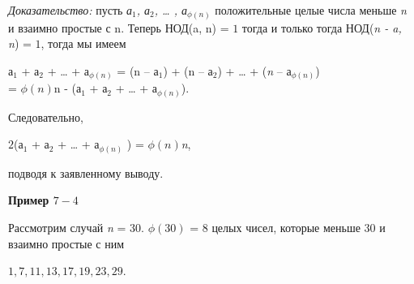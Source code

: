 \documentclass[12pt]{article}
\begin{document}
	
	\textit{Доказательство:} пусть \textit{ а$_1$, а$_2$, … , а$_{\phi(n)}$}  положительные целые числа меньше \textit{n} и взаимно простые с n. Теперь НОД(a, n) = $1$ тогда и только тогда НОД(\textit{n - a, n}) = $1$, тогда мы имеем 
	
	\begin{center}
		а$_1$  + а$_2$ +  …  + а$_{\phi(n)}$  = (n – а$_1$) + (n – а$_2$) + … + (\textit{n} – а$_{\phi(n)}$) \\
		= $\phi(n)$n - (а$_1$  + а$_2$ +  …  + а$_{\phi(n)}$).	
	\end{center}
	
	
	Следовательно, 
	
	\begin{center}
		$2$(а$_1$  + а$_2$ +  …  + а$_{\phi(n)}$ ) =  $\phi(n)$\textit{n},
	\end{center}
	
	
	подводя к заявленному выводу.
	
	\begin{flushleft}
		\textbf{Пример $7-4$}
	\end{flushleft}
	
	
	
	Рассмотрим случай \textit{n} = $30$. $\phi(30)$ = $8$ целых чисел, которые меньше $30$ и взаимно простые с ним
	
	\begin{center}
		$1, 7, 11, 13, 17, 19, 23, 29$.
	\end{center}
	
\end{document}
